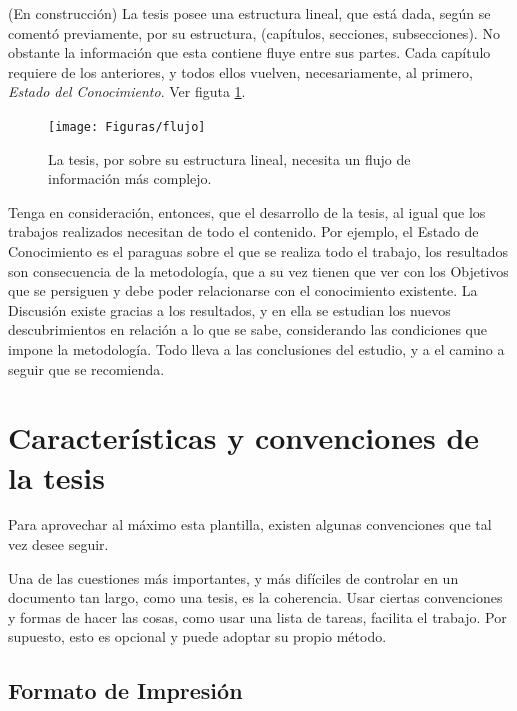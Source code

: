 (En construcción)
La tesis posee una estructura lineal, que está dada, según se comentó previamente,  por  su estructura, (capítulos, secciones, subsecciones). No obstante la información que esta contiene fluye entre sus partes. Cada capítulo requiere de los anteriores, y todos ellos vuelven, necesariamente, al primero, \emph{Estado del Conocimiento}. Ver figuta \ref{fig:flujo}.

\begin{figure}[th]
	\centering
	\texttt{[image: Figuras/flujo]}
	\captionsetup{margin=2cm}
	\caption[Flujo de lectura de la tesis]{La tesis, por  sobre su estructura lineal, necesita un flujo de información más complejo.  }
	\label{fig:flujo}
\end{figure}

Tenga en consideración, entonces,  que el desarrollo de la tesis, al igual que los trabajos realizados necesitan de todo el contenido. Por ejemplo, el Estado de Conocimiento es el paraguas sobre el que se realiza todo el trabajo, los resultados son consecuencia de la metodología, que a su vez tienen que ver con los Objetivos que se persiguen y debe poder relacionarse con el conocimiento existente. La Discusión existe gracias a los resultados, y en ella se estudian los nuevos descubrimientos en relación a lo que se sabe, considerando las condiciones que impone la metodología. Todo lleva a las conclusiones del estudio, y a el camino a seguir que se recomienda. 

\section{Características y convenciones de la tesis}\label{Convenciones}

Para aprovechar al máximo esta plantilla, existen algunas convenciones que tal vez desee seguir.

Una de las cuestiones más importantes, y más difíciles de controlar en un documento tan largo, como una tesis, es la coherencia. Usar ciertas convenciones y formas de hacer las cosas, como usar una lista de tareas, facilita el trabajo. Por supuesto, esto es opcional y puede adoptar su propio método.


\subsection{Formato de Impresión}


